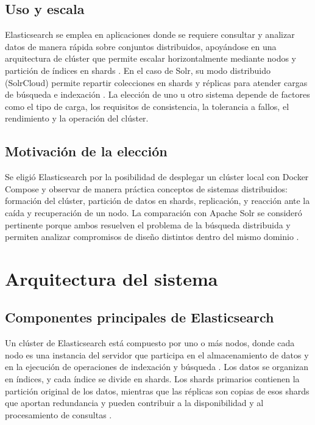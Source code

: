 \documentclass[12pt,a4paper]{article}
\begin{document}
\subsection{Uso y escala}
Elasticsearch se emplea en aplicaciones donde se requiere consultar y analizar datos de manera rápida sobre conjuntos distribuidos, apoyándose en una arquitectura de clúster que permite escalar horizontalmente mediante nodos y partición de índices en shards \cite{elastic_distributed_architecture,elastic_nodes_shards,calderon-2023}. En el caso de Solr, su modo distribuido (SolrCloud) permite repartir colecciones en shards y réplicas para atender cargas de búsqueda e indexación \cite{solr_shards_indexing,deniz-2023}. La elección de uno u otro sistema depende de factores como el tipo de carga, los requisitos de consistencia, la tolerancia a fallos, el rendimiento y la operación del clúster.

\subsection{Motivación de la elección}
Se eligió Elasticsearch por la posibilidad de desplegar un clúster local con Docker Compose y observar de manera práctica conceptos de sistemas distribuidos: formación del clúster, partición de datos en shards, replicación, y reacción ante la caída y recuperación de un nodo. La comparación con Apache Solr se consideró pertinente porque ambos resuelven el problema de la búsqueda distribuida y permiten analizar compromisos de diseño distintos dentro del mismo dominio \cite{deniz-2023}.

\section{Arquitectura del sistema}

\subsection{Componentes principales de Elasticsearch}
Un clúster de Elasticsearch está compuesto por uno o más nodos, donde cada nodo es una instancia del servidor que participa en el almacenamiento de datos y en la ejecución de operaciones de indexación y búsqueda \cite{elastic_nodes_shards,elastic_distributed_architecture}. Los datos se organizan en índices, y cada índice se divide en shards. Los shards primarios contienen la partición original de los datos, mientras que las réplicas son copias de esos shards que aportan redundancia y pueden contribuir a la disponibilidad y al procesamiento de consultas \cite{elastic_nodes_shards,elastic_read_write}.
\end{document}
